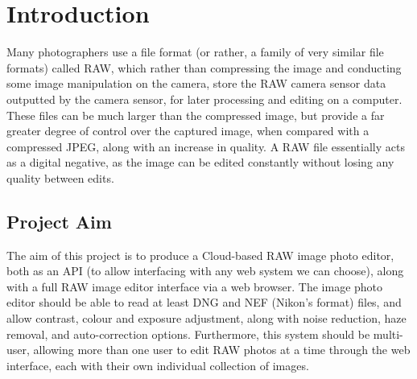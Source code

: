 \documentclass[12pt,a4paper]{article}
\begin{document}
\section{Introduction}

Many photographers use a file format (or rather, a family of very similar file formats) called RAW, which rather than compressing the image and conducting some image manipulation on the camera, store the RAW camera sensor data outputted by the camera sensor, for later processing and editing on a computer. These files can be much larger than the compressed image, but provide a far greater degree of control over the captured image, when compared with a compressed JPEG, along with an increase in quality. A RAW file essentially acts as a digital negative, as the image can be edited constantly without losing any quality between edits.  \cite{AllAboutTheFormat}




\subsection{Project Aim}
The aim of this project is to produce a Cloud-based RAW image photo editor, both as an API (to allow interfacing with any web system we can choose), along with a full RAW image editor interface via a web browser. The image photo editor should be able to read at least DNG and NEF (Nikon's format) files, and allow contrast, colour and exposure adjustment, along with noise reduction, haze removal, and auto-correction options. Furthermore, this system should be multi-user, allowing more than one user to edit RAW photos at a time through the web interface, each with their own individual collection of images.
\end{document}
